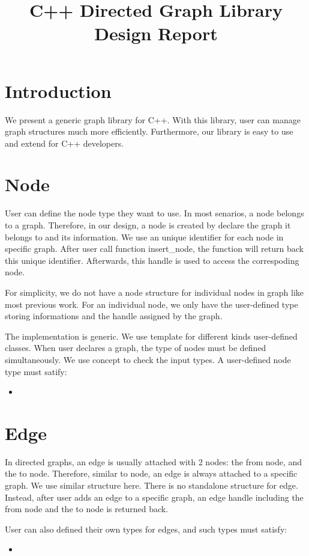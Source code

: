 \documentclass[]{article}
\title{C++ Directed Graph Library Design Report}
\author{}
\begin{document}
\maketitle

\tableofcontents
\newpage
\section{Introduction}
We present a generic graph library for C++. With this library, user can manage graph structures much more efficiently. Furthermore, our library is easy to use and extend for C++ developers.
\section {Node}
User can define the node type they want to use. In most senarios, a node belongs to a graph. Therefore, in our design, a node is created by declare the graph it belongs to and its information. We use an unique identifier for each node in specific graph. After user call function insert\_node, the function will return back this unique identifier. Afterwards, this handle is used to access the correspoding node.

For simplicity, we do not have a node structure for individual nodes in graph like most previous work. For an individual node, we only have the user-defined type storing informations and the handle assigned by the graph.

The implementation is generic. We use template for different kinds user-defined classes. When user declares a graph, the type of nodes must be defined simultaneously. We use concept to check the input types. A user-defined node type must satify:
\begin{itemize}
	\item
	\end{itemize}

\section {Edge}
In directed graphs, an edge is usually attached with 2 nodes: the from node, and the to node. Therefore, similar to node, an edge is always attached to a specific graph. We use similar structure here. There is no standalone structure for edge. Instead, after user adds an edge to a specific graph, an edge handle including the from node and the to node is returned back.

User can also defined their own types for edges, and such types must satisfy:
\begin{itemize}
	\item 
\end{itemize}
\end{document}
